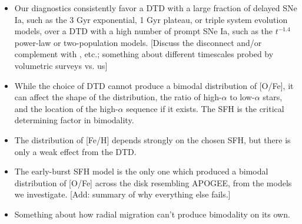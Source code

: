 \documentclass[twocolumn,twocolappendix,linenumbers,trackchanges]{aastex631}
\begin{document}
\begin{itemize}

    \item Our diagnostics consistently favor a DTD with a large fraction of delayed SNe Ia, such as the 3 Gyr exponential, 1 Gyr plateau, or triple system evolution models, over a DTD with a high number of prompt SNe Ia, such as the $t^{-1.4}$ power-law or two-population models. [Discuss the disconnect and/or complement with \citet{Maoz2017-CosmicDTD}, etc.; something about different timescales probed by volumetric surveys vs. us]
    
    \item While the choice of DTD cannot produce a bimodal distribution of [O/Fe], it can affect the shape of the distribution, the ratio of high-$\alpha$ to low-$\alpha$ stars, and the location of the high-$\alpha$ sequence if it exists. The SFH is the critical determining factor in bimodality.

    \item The distribution of [Fe/H] depends strongly on the chosen SFH, but there is only a weak effect from the DTD.

    \item The early-burst SFH model is the only one which produced a bimodal distribution of [O/Fe] across the disk resembling APOGEE, from the models we investigate. [Add: summary of why everything else fails.]

    \item Something about how radial migration can't produce bimodality on its own.
    
\end{itemize}
\end{document}
